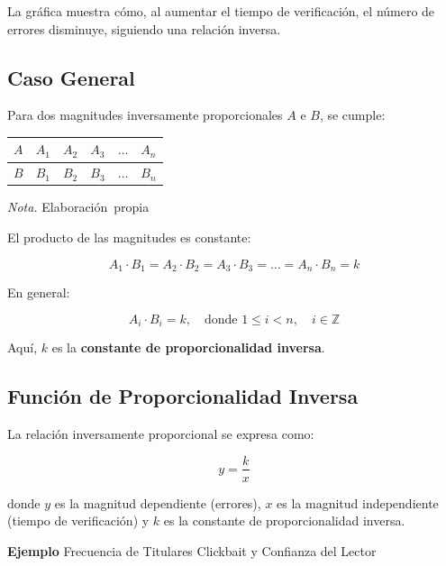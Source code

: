 \documentclass[
  stu,
  floatsintext,
  longtable,
  a4paper,
  nolmodern,
  notxfonts,
  notimes,
  12pt,
  colorlinks=true,linkcolor=blue,citecolor=blue,urlcolor=blue]{apa7}
\newcounter{none} %
\begin{document}
La gráfica muestra cómo, al aumentar el tiempo de verificación, el
número de errores disminuye, siguiendo una relación inversa.

\subsection{Caso General}\label{caso-general-1}

Para dos magnitudes inversamente proporcionales \(A\) e \(B\), se
cumple:

\begin{table}

{\caption{{Magnitudes inversamente
proporcionales}{\label{tbl-mytable11}}}}

{\def\LTcaptype{none} %
\begin{longtable}[]{@{}llllll@{}}
\toprule\noalign{}
\(A\) & \(A_1\) & \(A_2\) & \(A_3\) & \(\dots\) & \(A_n\) \\
\midrule\noalign{}
\endhead
\bottomrule\noalign{}
\endlastfoot
\(B\) & \(B_1\) & \(B_2\) & \(B_3\) & \(\dots\) & \(B_n\) \\
\end{longtable}
}

\noindent \emph{Nota.} Elaboración~propia

\end{table}

El producto de las magnitudes es constante:

\[
A_1 \cdot B_1 = A_2 \cdot B_2 = A_3 \cdot B_3 = \dots = A_n \cdot B_n = k
\]

En general:

\[
A_i \cdot B_i = k, \quad \text{donde } 1 \leq i < n, \quad i \in \mathbb{Z}
\]

Aquí, \(k\) es la \textbf{constante de proporcionalidad inversa}.

\subsection{Función de Proporcionalidad
Inversa}\label{funciuxf3n-de-proporcionalidad-inversa}

La relación inversamente proporcional se expresa como:

\[
y = \frac{k}{x}
\]

donde \(y\) es la magnitud dependiente (errores), \(x\) es la magnitud
independiente (tiempo de verificación) y \(k\) es la constante de
proporcionalidad inversa.

\textbf{Ejemplo} Frecuencia de Titulares Clickbait y Confianza del
Lector
\end{document}
